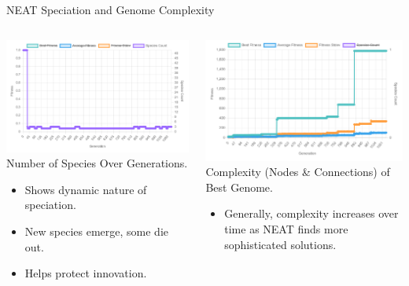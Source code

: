 \documentclass{beamer}
\begin{document}
\begin{frame}{NEAT Speciation and Genome Complexity}
  \begin{columns}[T]
    \begin{column}{0.5\textwidth}
      \centering
      \includegraphics[width=\linewidth]{media/neat_species_count.jpg}
      \tiny Number of Species Over Generations.
      \begin{itemize}
        \item Shows dynamic nature of speciation.
        \item New species emerge, some die out.
        \item Helps protect innovation.
      \end{itemize}
    \end{column}
    \begin{column}{0.5\textwidth}
      \centering
      \includegraphics[width=\linewidth]{media/neat_genome_complexity.png}
      \tiny Complexity (Nodes \& Connections) of Best Genome.
      \begin{itemize}
        \item Generally, complexity increases over time as NEAT finds more sophisticated solutions.
      \end{itemize}
    \end{column}
  \end{columns}
\end{frame}
\end{document}
